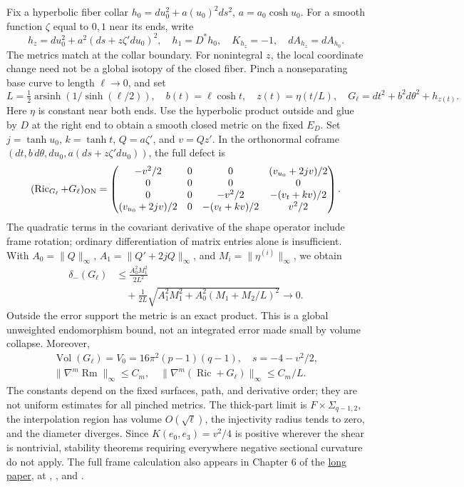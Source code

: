 \documentclass[a4paper,11pt]{article}
\numberwithin{equation}{section}
\theoremstyle{definition}
\newcommand{\Ric}{\operatorname{Ric}}
\newcommand{\Rm}{\operatorname{Rm}}
\newcommand{\Vol}{\operatorname{Vol}}
\begin{document}
Fix a hyperbolic fiber collar
$h_0=du_0^2+a(u_0)^2ds^2$, $a=a_0\cosh u_0$.
For a smooth function $\zeta$ equal to $0,1$ near its ends, write
\[
 h_z=du_0^2+a^2(ds+z\zeta' du_0)^2,
 \quad h_1=D^*h_0,
 \quad K_{h_z}=-1,
 \quad dA_{h_z}=dA_{h_0}.
\]
The metrics match at the collar boundary. For nonintegral $z$, the local coordinate change need not be a global isotopy of the closed fiber.
Pinch a nonseparating base curve to length $\ell\to0$, and set
\[
 L=\tfrac12\operatorname{arsinh}(1/\sinh(\ell/2)),\quad
 b(t)=\ell\cosh t,\quad z(t)=\eta(t/L),\quad
 G_\ell=dt^2+b^2d\theta^2+h_{z(t)}.
\]
Here $\eta$ is constant near both ends. Use the hyperbolic product outside and glue by $D$ at the right end to obtain a smooth closed metric on the fixed $E_D$.
Set $j=\tanh u_0$, $k=\tanh t$, $Q=a\zeta'$, and $v=Qz'$.
In the orthonormal coframe $(dt,b\,d\theta,du_0,a(ds+z\zeta'du_0))$, the full defect is
\begin{equation}\label{eq:bundleRicci}
 (\Ric_{G_\ell}+G_\ell)_{\rm ON}=
 \begin{pmatrix}
 -v^2/2&0&0&(v_{u_0}+2jv)/2\\
 0&0&0&0\\
 0&0&-v^2/2&-(v_t+kv)/2\\
 (v_{u_0}+2jv)/2&0&-(v_t+kv)/2&v^2/2
 \end{pmatrix}.
\end{equation}
The quadratic terms in the covariant derivative of the shape operator include frame rotation; ordinary differentiation of matrix entries alone is insufficient.
With $A_0=\|Q\|_\infty$, $A_1=\|Q'+2jQ\|_\infty$, and $M_i=\|\eta^{(i)}\|_\infty$, we obtain
\begin{equation}\label{eq:bundlebound}
 \begin{aligned}
 \delta_-(G_\ell)&\le\frac{A_0^2M_1^2}{2L^2}\\
 &\quad+\frac1{2L}\sqrt{A_1^2M_1^2+A_0^2(M_1+M_2/L)^2}\longrightarrow0.
 \end{aligned}
\end{equation}
Outside the error support the metric is an exact product. This is a global unweighted endomorphism bound, not an integrated error made small by volume collapse.
Moreover,
\[
 \begin{gathered}
 \Vol(G_\ell)=V_0=16\pi^2(p-1)(q-1),\quad
 s=-4-v^2/2,\\
 \|\nabla^m\Rm\|_\infty\le C_m,\quad
 \|\nabla^m(\Ric+G_\ell)\|_\infty\le C_m/L.
 \end{gathered}
\]
The constants depend on the fixed surfaces, path, and derivative order; they are not uniform estimates for all pinched metrics.
The thick-part limit is $F\times\Sigma_{q-1,2}$, the interpolation region has volume $O(\sqrt\ell)$, the injectivity radius tends to zero, and the diameter diverges.
Since $K(e_0,e_3)=v^2/4$ is positive wherever the shear is nontrivial, stability theorems requiring everywhere negative sectional curvature do not apply.
The full frame calculation also appears in Chapter 6 of the \href{20260912.tex}{long paper}, at , , and .
\end{document}
